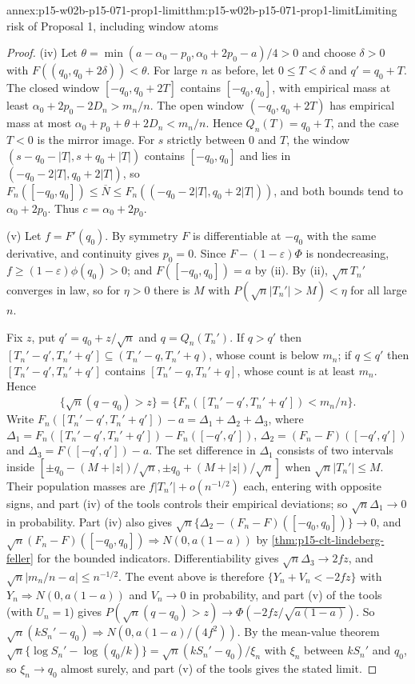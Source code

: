 \begin{annexitem}{annex:p15-w02b-p15-071-prop1-limit}{thm:p15-w02b-p15-071-prop1-limit}{Limiting risk of Proposal 1, including window atoms}
\begin{proof}
(iv) Let \(\theta=\min(a-\alpha_0-p_0,\alpha_0+2p_0-a)/4>0\) and choose
\(\delta>0\) with \(F((q_0,q_0+2\delta))<\theta\). For large \(n\) as
before, let \(0\leq T<\delta\) and \(q'=q_0+T\). The closed window
\([-q_0,q_0+2T]\) contains \([-q_0,q_0]\), with empirical mass at least
\(\alpha_0+2p_0-2D_n>m_n/n\). The open window \((-q_0,q_0+2T)\) has
empirical mass at most \(\alpha_0+p_0+\theta+2D_n<m_n/n\). Hence
\(Q_n(T)=q_0+T\), and the case \(T<0\) is the mirror image. For \(s\)
strictly between \(0\) and \(T\), the window
\((s-q_0-|T|,s+q_0+|T|)\) contains \([-q_0,q_0]\) and lies in
\((-q_0-2|T|,q_0+2|T|)\), so
\(F_n([-q_0,q_0])\leq\overline N\leq F_n((-q_0-2|T|,q_0+2|T|))\), and
both bounds tend to \(\alpha_0+2p_0\). Thus \(c=\alpha_0+2p_0\).

(v) Let \(f=F'(q_0)\). By symmetry \(F\) is differentiable at
\(-q_0\) with the same derivative, and continuity gives \(p_0=0\).
Since \(F-(1-\varepsilon)\Phi\) is nondecreasing,
\(f\geq(1-\varepsilon)\phi(q_0)>0\); and \(F([-q_0,q_0])=a\) by (ii).
By (ii), \(\sqrt nT_n'\) converges in law, so for \(\eta>0\) there is
\(M\) with \(P(\sqrt n|T_n'|>M)<\eta\) for all large \(n\).

Fix \(z\), put \(q'=q_0+z/\sqrt n\) and \(q=Q_n(T_n')\). If \(q>q'\)
then \([T_n'-q',T_n'+q']\subseteq(T_n'-q,T_n'+q)\), whose count is
below \(m_n\); if \(q\leq q'\) then \([T_n'-q',T_n'+q']\) contains
\([T_n'-q,T_n'+q]\), whose count is at least \(m_n\). Hence
\[
 \{\sqrt n(q-q_0)>z\}=\{F_n([T_n'-q',T_n'+q'])<m_n/n\}.
\]
Write \(F_n([T_n'-q',T_n'+q'])-a=\Delta_1+\Delta_2+\Delta_3\), where
\(\Delta_1=F_n([T_n'-q',T_n'+q'])-F_n([-q',q'])\),
\(\Delta_2=(F_n-F)([-q',q'])\) and \(\Delta_3=F([-q',q'])-a\).
The set difference in \(\Delta_1\) consists of two intervals inside
\([\pm q_0-(M+|z|)/\sqrt n,\pm q_0+(M+|z|)/\sqrt n]\) when
\(\sqrt n|T_n'|\leq M\). Their population masses are
\(f|T_n'|+o(n^{-1/2})\) each, entering with opposite signs, and part
(iv) of the tools controls their empirical deviations; so
\(\sqrt n\Delta_1\to0\) in probability. Part (iv) also gives
\(\sqrt n\{\Delta_2-(F_n-F)([-q_0,q_0])\}\to0\), and
\(\sqrt n(F_n-F)([-q_0,q_0])\Rightarrow N(0,a(1-a))\) by
\cref{thm:p15-clt-lindeberg-feller} for the bounded indicators.
Differentiability gives \(\sqrt n\Delta_3\to2fz\), and
\(\sqrt n|m_n/n-a|\leq n^{-1/2}\). The event above is therefore
\(\{Y_n+V_n<-2fz\}\) with \(Y_n\Rightarrow N(0,a(1-a))\) and
\(V_n\to0\) in probability, and part (v) of the tools (with
\(U_n=1\)) gives
\(P(\sqrt n(q-q_0)>z)\to\Phi(-2fz/\sqrt{a(1-a)})\). So
\(\sqrt n(kS_n'-q_0)\Rightarrow N(0,a(1-a)/(4f^2))\).
By the mean-value theorem
\(\sqrt n\{\log S_n'-\log(q_0/k)\}=\sqrt n(kS_n'-q_0)/\xi_n\) with
\(\xi_n\) between \(kS_n'\) and \(q_0\), so \(\xi_n\to q_0\) almost
surely, and part (v) of the tools gives the stated limit.
\end{proof}
\end{annexitem}

